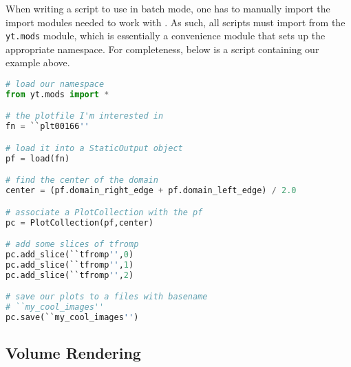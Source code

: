 When writing a script to use in batch mode, one has to manually import
the import modules needed to work with \yt.  As such, all scripts must
import from the {\tt yt.mods} module, which is essentially a
convenience module that sets up the appropriate \yt namespace.  
For completeness, below is a script containing our example above.
\newpage
\begin{lstlisting}[language=Python]
# load our namespace
from yt.mods import *

# the plotfile I'm interested in
fn = ``plt00166''

# load it into a StaticOutput object
pf = load(fn)

# find the center of the domain
center = (pf.domain_right_edge + pf.domain_left_edge) / 2.0

# associate a PlotCollection with the pf
pc = PlotCollection(pf,center)

# add some slices of tfromp
pc.add_slice(``tfromp'',0)
pc.add_slice(``tfromp'',1)
pc.add_slice(``tfromp'',2)

# save our plots to a files with basename
# ``my_cool_images''
pc.save(``my_cool_images'')
\end{lstlisting}

\subsection{Volume Rendering}

